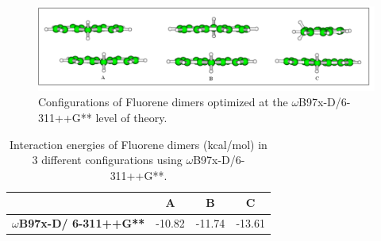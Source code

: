 \begin{figure}[H]
	\begin{center}
		\includegraphics[scale=0.9]{image/Fluo-dim}
	\end{center}
	\caption{ Configurations of Fluorene dimers optimized at the $\omega$B97x-D/6-311++G** level of theory. }
\end{figure}


\begin{table}[htbp]
	\caption{Interaction energies of Fluorene dimers (kcal/mol) in 3 different configurations using $\omega$B97x-D/6-311++G**.}
	\begin{center}
		\begin{tabular}{cccc}
			\toprule
			& \textbf{A} & \textbf{B} & \textbf{C} \\ 
			\midrule
			\textbf{$\omega$B97x-D/
				6-311++G** }& -10.82	& -11.74	& -13.61	\\ 
			\bottomrule
		\end{tabular}
	\end{center}
	\label{}
\end{table}


